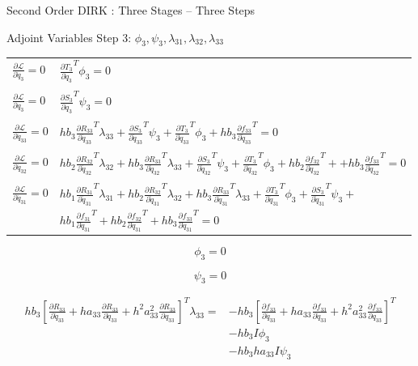 \documentclass{beamer}
\newcommand{\pd}[2]{\frac{\partial #1}{\partial #2}}
\begin{document}
\begin{frame}[allowframebreaks]{Second Order DIRK : Three Stages -- Three Steps}
\begin{block}{Adjoint Variables Step 3: $\phi_3,\psi_3,\lambda_{31},\lambda_{32},\lambda_{33}$}
  \begin{table}[h]
    \centering
    \label{adjoint_step3}
    \begin{tabular}{l|l}
      $\pd{{\mathcal L}}{\dot{q}_{3}}  = 0$  & $ \pd{{T_3}}{\dot{q}_{3}}^T \phi_3 = 0$  \\
      &\\
      $\pd{{\mathcal L}}{{q}_{3}}  = 0$      & $\pd{S_3}{q_3}^T \psi_3 = 0$ \\
      &\\
      $\pd{{\mathcal L}}{\ddot{q}_{33}} = 0$ & $hb_3\pd{R_{33}}{\ddot{q}_{33}}^T\lambda_{33} + \pd{S_3}{\ddot{q}_{33}}^T \psi_3 + \pd{T_3}{\ddot{q}_{33}}^T \phi_3 + hb_3\pd{f_{33}}{\ddot{q}_{33}}^T = 0$ \\
      &\\
      $\pd{{\mathcal L}}{\ddot{q}_{32}} = 0$ & $hb_2\pd{R_{32}}{\ddot{q}_{32}}^T\lambda_{32} + hb_3\pd{R_{33}}{\ddot{q}_{32}}^T\lambda_{33} + \pd{S_3}{\ddot{q}_{32}}^T \psi_3 + \pd{T_3}{\ddot{q}_{32}}^T \phi_3 + hb_2\pd{f_{32}}{\ddot{q}_{32}}^T + + hb_3\pd{f_{33}}{\ddot{q}_{32}}^T= 0$ \\
      &\\
      $\pd{{\mathcal L}}{\ddot{q}_{31}} = 0$ & $hb_1 \pd{R_{31}}{\ddot{q}_{31}}^T \lambda_{31} +  h b_2 \pd{R_{32}}{\ddot{q}_{31}}^T \lambda_{32} + h b_3 \pd{R_{33}}{\ddot{q}_{31}}^T \lambda_{33}  + \pd{T_3}{\ddot{q}_{31}}^T \phi_3 + \pd{S_3}{\ddot{q}_{31}}^T \psi_3 + $ \\ 
      & $ h b_1 \pd{f_{31}}{\ddot{q}_{31}}^T +  h b_2 \pd{f_{32}}{\ddot{q}_{31}}^T +  h b_3 \pd{f_{33}}{\ddot{q}_{31}}^T = 0  $ \\
    \end{tabular}
  \end{table}
\end{block}

\framebreak

\begin{equation}
  \phi_3 = 0
\end{equation}

\begin{equation}
  \psi_3 = 0
\end{equation}

\begin{equation}
  \begin{split}
    hb_3\left[\pd{R_{33}}{\ddot{q}_{33}} + ha_{33}\pd{R_{33}}{\dot{q}_{33}} + h^2a_{33}^2 \pd{R_{33}}{{q}_{33}} \right]^T \lambda_{33} = & - hb_3 \left[\pd{f_{33}}{\ddot{q}_{33}} + ha_{33}\pd{f_{33}}{\dot{q}_{33}} + h^2a_{33}^2 \pd{f_{33}}{{q}_{33}} \right]^T \\ 
    & - hb_3 I \phi_3 \\ 
    & - hb_3ha_{33} I  \psi_3
  \end{split}
\end{equation}


\end{frame}
\end{document}

